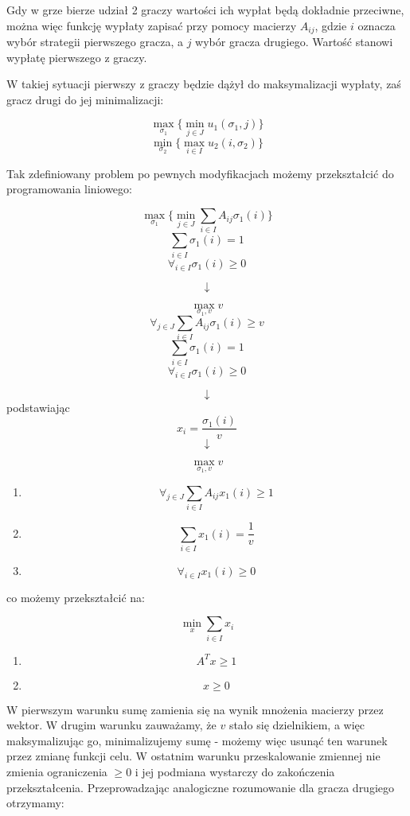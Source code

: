 \documentclass[polish]{standalone}
\begin{document}
Gdy w grze bierze udział 2 graczy wartości ich wypłat będą dokładnie przeciwne, można więc funkcję wypłaty zapisać przy
pomocy macierzy $A_{ij}$, gdzie $i$ oznacza wybór strategii pierwszego gracza, a $j$ wybór gracza drugiego. Wartość
stanowi wypłatę pierwszego z graczy.

W takiej sytuacji pierwszy z graczy będzie dążył do maksymalizacji wypłaty, zaś gracz drugi do jej minimalizacji:

$$\max_{\sigma_1} \{ \min_{j \in J} u_1(\sigma_1, j) \}$$
$$\min_{\sigma_2} \{ \max_{i \in I} u_2(i, \sigma_2) \}$$

Tak zdefiniowany problem po pewnych modyfikacjach możemy przekształcić do programowania liniowego:

$$\max_{\sigma_1} \{ \min_{j \in J} \sum_{i \in I} A_{ij} \sigma_1(i) \}$$
$$\sum_{i \in I} \sigma_1(i) = 1$$
$$\forall_{i \in I} \sigma_1(i) \geq 0$$

$$\downarrow$$

$$\max_{\sigma_1,v} v$$
$$\forall_{j \in J} \sum_{i \in I} A_{ij} \sigma_1(i) \geq v$$
$$\sum_{i \in I} \sigma_1(i) = 1$$
$$\forall_{i \in I} \sigma_1(i) \geq 0$$

$$\downarrow$$
podstawiając $$x_i = \frac{\sigma_1(i)}{v}$$
$$\downarrow$$

$$\max_{\sigma_1,v} v$$
\begin{enumerate}
\item $$\forall_{j \in J} \sum_{i \in I} A_{ij} x_1(i) \geq 1$$
\item $$\sum_{i \in I} x_1(i) = \frac{1}{v}$$
\item $$\forall_{i \in I} x_1(i) \geq 0$$
\end{enumerate}

co możemy przekształcić na:

$$\min_x \sum_{i \in I} x_i$$
\begin{enumerate}
\item $$A^Tx \geq 1$$
\item $$x \geq 0$$
\end{enumerate}

W pierwszym warunku sumę zamienia się na wynik mnożenia macierzy przez wektor. W drugim warunku zauważamy, że $v$ stało
się dzielnikiem, a więc maksymalizując go, minimalizujemy sumę - możemy więc usunąć ten warunek przez zmianę funkcji
celu. W ostatnim warunku przeskalowanie zmiennej nie zmienia ograniczenia $\geq 0$ i jej podmiana wystarczy do
zakończenia przekształcenia. Przeprowadzając analogiczne rozumowanie dla gracza drugiego otrzymamy:
\end{document}
